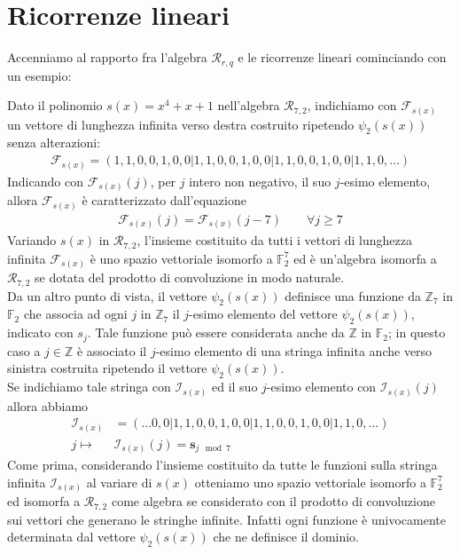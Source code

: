\section{Ricorrenze lineari}

Accenniamo al rapporto fra l'algebra $\mathcal{R}_{r,q}$ e le ricorrenze lineari cominciando con un esempio:
\begin{esempio}\label{ese:ricorr1}
   Dato il polinomio $s(x) = x^4 + x+ 1$ nell'algebra $\mathcal{R}_{7,2}$, indichiamo con $\mathscr{F}_{s(x)}$ un vettore di lunghezza infinita verso destra costruito ripetendo $\psi_{2}(s(x))$ senza alterazioni:
   \begin{align*}
      \mathscr{F}_{s(x)} = (1,1,0,0,1,0,0 | 1,1,0,0,1,0,0  | 1,1,0,0,1,0,0 | 1,1,0, \dots )
   \end{align*}
   Indicando con $\mathscr{F}_{s(x)}(j)$, per $j$ intero non negativo, il suo $j$-esimo elemento, allora $\mathscr{F}_{s(x)}$ è caratterizzato dall'equazione
   \begin{align*}
      \mathscr{F}_{s(x)} (j) = \mathscr{F}_{s(x)} (j-7) \qquad \forall j \geq 7
   \end{align*}
   Variando $s(x)$ in $\mathcal{R}_{7,2}$, l'insieme costituito da tutti i vettori di lunghezza infinita $\mathscr{F}_{s(x)}$ è uno spazio vettoriale isomorfo a $\mathbb{F}_{2}^{7}$ ed è un'algebra isomorfa a $\mathcal{R}_{7,2}$ se dotata del prodotto di convoluzione in modo naturale.\\
   Da un altro punto di vista, il vettore $\psi_{2}(s(x))$ definisce una funzione da $\mathbb{Z}_{7}$ in $\mathbb{F}_{2}$ che associa ad ogni $j$ in $\mathbb{Z}_{7}$ il $j$-esimo elemento del vettore $\psi_{2}(s(x))$, indicato con $s_j$. Tale funzione può essere considerata anche da $\mathbb{Z}$ in $\mathbb{F}_{2}$; in questo caso a $j \in \mathbb{Z}$ è associato il $j$-esimo elemento di una stringa infinita anche verso sinistra costruita ripetendo il vettore $\psi_{2}(s(x))$.\\
   Se indichiamo tale stringa con $\mathscr{I}_{s(x)}$ ed il suo $j$-esimo elemento con $\mathscr{I}_{s(x)}(j)$ allora abbiamo
   \begin{align*}
      \mathscr{I}_{s(x)} &= ( \dots 0,0 | 1,1,0,0,1,0,0  | 1,1,0,0,1,0,0 | 1,1,0, \dots ) \\
      j \longmapsto & \mathscr{I}_{s(x)}(j) = \mathbf{s}_{j \mod{7}}
   \end{align*}
   Come prima, considerando l'insieme costituito da tutte le funzioni sulla stringa infinita $\mathscr{I}_{s(x)}$ al variare di $s(x)$ otteniamo uno spazio vettoriale isomorfo a $\mathbb{F}_{2}^{7}$ ed isomorfa a $\mathcal{R}_{7,2}$ come algebra se considerato con il prodotto di convoluzione sui vettori che generano le stringhe infinite. Infatti ogni funzione è univocamente determinata dal vettore $\psi_{2}(s(x))$ che ne definisce il dominio. \\
\end{esempio}
